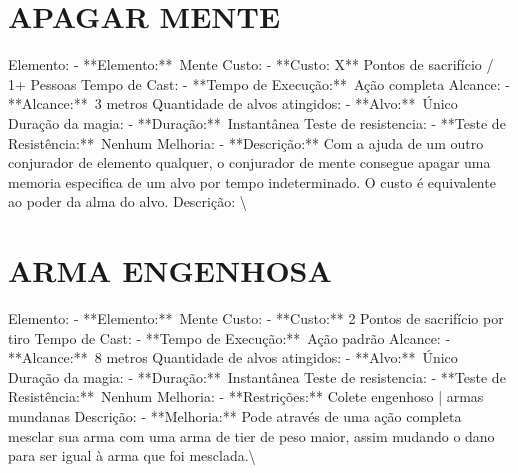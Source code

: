 \documentclass{article}%
\begin{document}
\section{APAGAR MENTE}%
\label{sec:APAGARMENTE}%
Elemento: {-} **Elemento:**~Mente\newline%
Custo: {-} **Custo: X** Pontos de sacrifício / 1+ Pessoas\newline%
Tempo de Cast: {-} **Tempo de Execução:**~Ação completa\newline%
Alcance: {-} **Alcance:**~3 metros\newline%
Quantidade de alvos atingidos: {-} **Alvo:**~Único\newline%
Duração da magia: {-} **Duração:**~Instantânea\newline%
Teste de resistencia: {-} **Teste de Resistência:**~Nenhum\newline%
Melhoria: {-} **Descrição:** Com a ajuda de um outro conjurador de elemento qualquer, o conjurador de mente consegue apagar uma memoria especifica de um alvo por tempo indeterminado. O custo é equivalente ao poder da alma do alvo.\newline%
Descrição: \textbackslash{}

%
\section{ARMA ENGENHOSA}%
\label{sec:ARMAENGENHOSA}%
Elemento: {-} **Elemento:**~Mente\newline%
Custo: {-} **Custo:** 2 Pontos de sacrifício por tiro\newline%
Tempo de Cast: {-} **Tempo de Execução:**~Ação padrão\newline%
Alcance: {-} **Alcance:**~8 metros\newline%
Quantidade de alvos atingidos: {-} **Alvo:**~Único\newline%
Duração da magia: {-} **Duração:**~Instantânea\newline%
Teste de resistencia: {-} **Teste de Resistência:**~Nenhum\newline%
Melhoria: {-} **Restrições:** Colete engenhoso | armas mundanas\newline%
Descrição: {-} **Melhoria:** Pode através de uma ação completa mesclar sua arma com uma arma de tier de peso maior, assim mudando o dano para ser igual à arma que foi mesclada.\textbackslash{}

%
\end{document}
